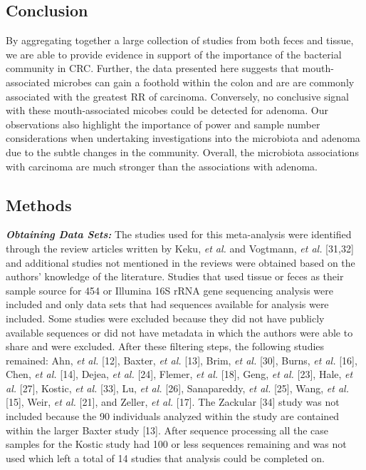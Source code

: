 \documentclass[12pt,]{article}
\begin{document}
\newpage

\subsection{Conclusion}\label{conclusion}

By aggregating together a large collection of studies from both feces
and tissue, we are able to provide evidence in support of the importance
of the bacterial community in CRC. Further, the data presented here
suggests that mouth-associated microbes can gain a foothold within the
colon and are are commonly associated with the greatest RR of carcinoma.
Conversely, no conclusive signal with these mouth-associated micobes
could be detected for adenoma. Our observations also highlight the
importance of power and sample number considerations when undertaking
investigations into the microbiota and adenoma due to the subtle changes
in the community. Overall, the microbiota associations with carcinoma
are much stronger than the associations with adenoma.

\newpage

\subsection{Methods}\label{methods}

\textbf{\emph{Obtaining Data Sets:}} The studies used for this
meta-analysis were identified through the review articles written by
Keku, \emph{et al.} and Vogtmann, \emph{et al.} {[}31,32{]} and
additional studies not mentioned in the reviews were obtained based on
the authors' knowledge of the literature. Studies that used tissue or
feces as their sample source for 454 or Illumina 16S rRNA gene
sequencing analysis were included and only data sets that had sequences
available for analysis were included. Some studies were excluded because
they did not have publicly available sequences or did not have metadata
in which the authors were able to share and were excluded. After these
filtering steps, the following studies remained: Ahn, \emph{et al.}
{[}12{]}, Baxter, \emph{et al.} {[}13{]}, Brim, \emph{et al.} {[}30{]},
Burns, \emph{et al.} {[}16{]}, Chen, \emph{et al.} {[}14{]}, Dejea,
\emph{et al.} {[}24{]}, Flemer, \emph{et al.} {[}18{]}, Geng, \emph{et
al.} {[}23{]}, Hale, \emph{et al.} {[}27{]}, Kostic, \emph{et al.}
{[}33{]}, Lu, \emph{et al.} {[}26{]}, Sanapareddy, \emph{et al.}
{[}25{]}, Wang, \emph{et al.} {[}15{]}, Weir, \emph{et al.} {[}21{]},
and Zeller, \emph{et al.} {[}17{]}. The Zackular {[}34{]} study was not
included because the 90 individuals analyzed within the study are
contained within the larger Baxter study {[}13{]}. After sequence
processing all the case samples for the Kostic study had 100 or less
sequences remaining and was not used which left a total of 14 studies
that analysis could be completed on.
\end{document}
